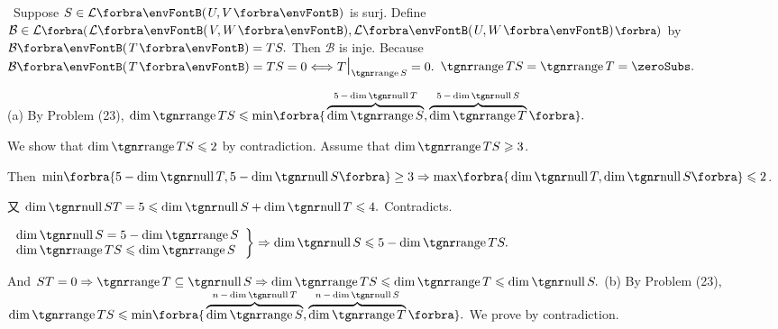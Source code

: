 \BulletPointX{}\,\,\,Suppose $S\in\Lm{U,V}$ is surj. Define $\mathcal{B}\in\Lm[\BigPar]{\Lm{V,W},\Lm{U,W}}$ by $\mathcal{B}\Par{T}=TS.$\TextB{}
Then $\mathcal{B}$ is inje. Because {$\mathcal{B}\Par{T}=TS=0\Longleftrightarrow T\mmid_{\range S}=0.$ \;\Or $\range TS=\range T=\zeroSubs.$}\vspace{-3pt}
\SepLine\pagebreak

\par\vspace{-4pt}\quad
(a) By Problem (23), $\dim\range TS\leqslant\min\!\Bra{\overbrace{\dim \range S}^{5\,-\,\dim\null T}, \overbrace{\dim\range T}^{5\,-\,\dim\null S}}.$\par\quad\Ha
We show that $\dim\range TS\leqslant 2$ by contradiction. Assume that $\dim\range TS\geqslant 3$.\par\quad\Ha
Then $\min\!\Bra{5-\dim\null T,5-\dim\null S}\geq 3\Rightarrow\max\!\Bra{\dim\null T,\dim\null S}\leqslant 2$.\par\quad\Ha
又 $\dim\null ST=5\leqslant\dim\null S+\dim\null T\leqslant 4.$ Contradicts.\vspace{8pt}\par\quad\Ha
\Or $\MathRightBrace{l}{\dim\null S=5-\dim\range S\\ \dim\range TS\leqslant\dim\range S}\Rightarrow\dim\null S\leqslant 5-\dim\range TS.$\par\vspace{6pt}\quad\Ha
And $ST=0\Rightarrow\range T\subseteq\null S\Rightarrow\dim\range TS\leqslant\dim\range T\leqslant\dim\null S.$\PfEnd\vspace{10pt}\quad
(b) By Problem (23), $\dim\range TS\leqslant\min\!\Bra{\overbrace{\dim \range S}^{n\,-\,\dim\null T}, \overbrace{\dim\range T}^{n\,-\,\dim\null S}}.$ We prove by contradiction.\par\quad\Hb

